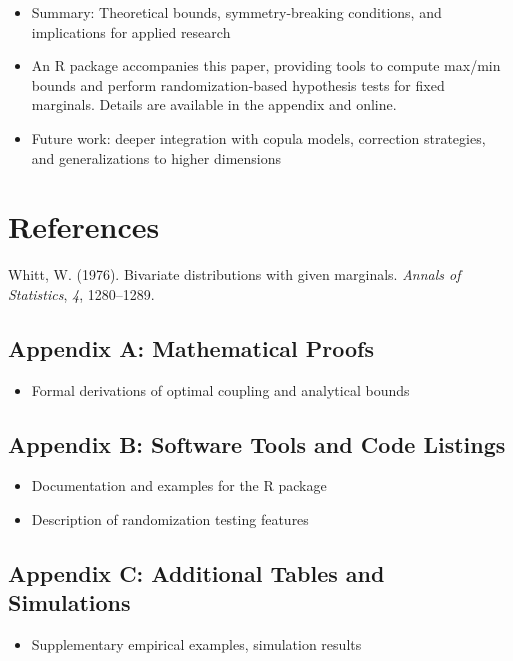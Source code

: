 \documentclass[
  12pt,
]{article}
\providecommand{\tightlist}{%
  \setlength{\itemsep}{0pt}\setlength{\parskip}{0pt}}\usepackage{longtable,booktabs,array}
\newlength{\cslhangindent}
\newenvironment{CSLReferences}[2] %
 {\begin{list}{}{%
  \setlength{\itemindent}{0pt}
  \setlength{\leftmargin}{0pt}
  \setlength{\parsep}{0pt}
  \ifodd #1
   \setlength{\leftmargin}{\cslhangindent}
   \setlength{\itemindent}{-1\cslhangindent}
  \fi
  \setlength{\itemsep}{#2\baselineskip}}}
 {\end{list}}
\begin{document}
\begin{itemize}
\tightlist
\item
  Summary: Theoretical bounds, symmetry-breaking conditions, and
  implications for applied research
\item
  An R package accompanies this paper, providing tools to compute
  max/min bounds and perform randomization-based hypothesis tests for
  fixed marginals. Details are available in the appendix and online.
\item
  Future work: deeper integration with copula models, correction
  strategies, and generalizations to higher dimensions
\end{itemize}

\newpage

\section{References}\label{references}

\label{refs}
\begin{CSLReferences}{1}{0}
Whitt, W. (1976). Bivariate distributions with given marginals.
\emph{Annals of Statistics}, \emph{4}, 1280--1289.

\end{CSLReferences}

\newpage

\appendix

\subsection{Appendix A: Mathematical
Proofs}\label{appendix-a-mathematical-proofs}

\begin{itemize}
\tightlist
\item
  Formal derivations of optimal coupling and analytical bounds
\end{itemize}

\subsection{Appendix B: Software Tools and Code
Listings}\label{appendix-b-software-tools-and-code-listings}

\begin{itemize}
\tightlist
\item
  Documentation and examples for the R package\\
\item
  Description of randomization testing features
\end{itemize}

\subsection{Appendix C: Additional Tables and
Simulations}\label{appendix-c-additional-tables-and-simulations}

\begin{itemize}
\tightlist
\item
  Supplementary empirical examples, simulation results
\end{itemize}
\end{document}
